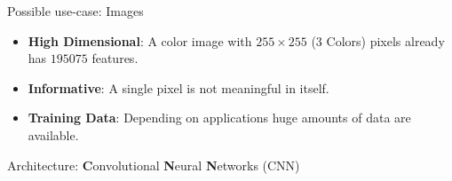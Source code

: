 \documentclass[11pt,compress,t,notes=noshow, xcolor=table]{beamer}
\begin{document}
\begin{frame} {Possible use-case: Images}
\begin{itemize}
\item \textbf{High Dimensional}: A color image with $255 \times 255$ (3 Colors) pixels already has $195075$ features.
\vspace{.1cm}
\item \textbf{Informative}: A single pixel is not meaningful in itself.
\vspace{.1cm}
\item \textbf{Training Data}: Depending on applications huge amounts of data are available.
\end{itemize}
\vspace{.3cm}
Architecture: \textbf{C}onvolutional \textbf{N}eural \textbf{N}etworks (CNN)
\begin{figure}
\centering
{}
\end{figure}
\end{frame}
\end{document}
